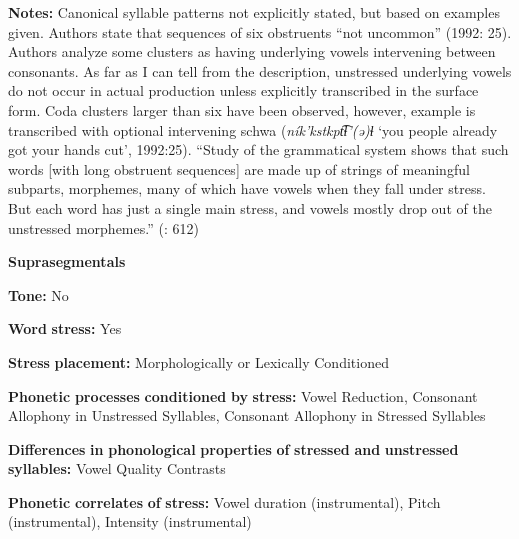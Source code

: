 \begin{styleBody}
\textbf{Notes:} Canonical syllable patterns not explicitly stated, but based on examples given. Authors state that sequences of six obstruents “not uncommon” (1992: 25). Authors analyze some clusters as having underlying vowels intervening between consonants. As far as I can tell from the description, unstressed underlying vowels do not occur in actual production unless explicitly transcribed in the surface form. Coda clusters larger than six have been observed, however, example is transcribed with optional intervening schwa (\textit{ník’kstkpt͡ɬ’(ə)ɬ} ‘you people already got your hands cut’, 1992:25). “Study of the grammatical system shows that such words [with long obstruent sequences] are made up of strings of meaningful subparts, morphemes, many of which have vowels when they fall under stress. But each word has just a single main stress, and vowels mostly drop out of the unstressed morphemes.” (\citealt{ThompsonEtAl1996}: 612)
\end{styleBody}

\begin{styleBody}
\textbf{Suprasegmentals}
\end{styleBody}

\begin{styleBody}
\textbf{Tone:} No
\end{styleBody}

\begin{styleBody}
\textbf{Word} \textbf{stress:} Yes
\end{styleBody}

\begin{styleBody}
\textbf{Stress} \textbf{placement:} Morphologically or Lexically Conditioned
\end{styleBody}

\begin{styleBody}
\textbf{Phonetic} \textbf{processes} \textbf{conditioned} \textbf{by} \textbf{stress:} Vowel Reduction, Consonant Allophony in Unstressed Syllables, Consonant Allophony in Stressed Syllables
\end{styleBody}

\begin{styleBody}
\textbf{Differences} \textbf{in} \textbf{phonological} \textbf{properties} \textbf{of} \textbf{stressed} \textbf{and} \textbf{unstressed} \textbf{syllables:} Vowel Quality Contrasts
\end{styleBody}

\begin{styleBody}
\textbf{Phonetic} \textbf{correlates} \textbf{of} \textbf{stress:} Vowel duration (instrumental), Pitch (instrumental), Intensity (instrumental)
\end{styleBody}

